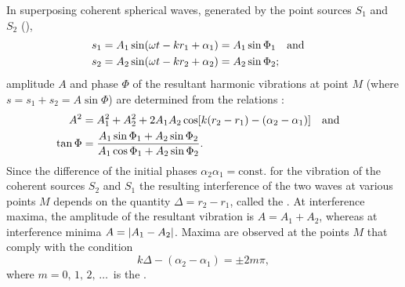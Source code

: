 In superposing coherent spherical waves, generated by the point sources $S_{1}$ and $S_{2}$ (),
\begin{align*}%
s_{1} & = A_{1} \sin(\omega t  - kr_{1}+ \alpha_{1})= A_{1}\sin
\Phi_{1} \qand\\
s_{2} & = A_{2} \sin(\omega t  - kr_{2}+ \alpha_{2})= A_{2}\sin
\Phi_{2};
\end{align*}
amplitude $A$ and phase $\Phi$ of the resultant harmonic vibrations at point $M$ (where $s = s_{1}+ s_{2} = A \sin \Phi$) are determined from the relations :
\begin{align*}%
A^{2} & = A_{1}^{2} + A_{2}^{2} + 2 A_{1}A_{2} \cos [k(r_{2} - r_{1}) - (\alpha_{2} - \alpha_{1})] \qand \\
\tan \Phi & = \frac{A_{1}\sin \Phi_{1} + A_{2}\sin \Phi_{2}}{A_{1}\cos \Phi_{1} + A_{2}\sin \Phi_{2}}. 
\end{align*}
Since the difference of the initial phases $\alpha_{2} \alpha_{1}= \text{const.}$ for the vibration of the coherent sources $S_{2}$ and $S_{1}$ the resulting interference of the two waves at various points $M$ depends on the quantity $\Delta = r_{2} - r_{1}$, called the . At interference maxima, the amplitude of the resultant vibration is $A = A_{1}+ A_{2}$, whereas at interference minima $A = \abs{A_{1}- A_{2}}$. Maxima are observed at the points $M$ that
comply with the condition 
\begin{equation*}%
k \Delta - (\alpha_{2} - \alpha_{1}) = \pm 2m \pi,
\end{equation*}
where $m = 0, \,1,\, 2,\, \ldots{\,}$ is the . 

